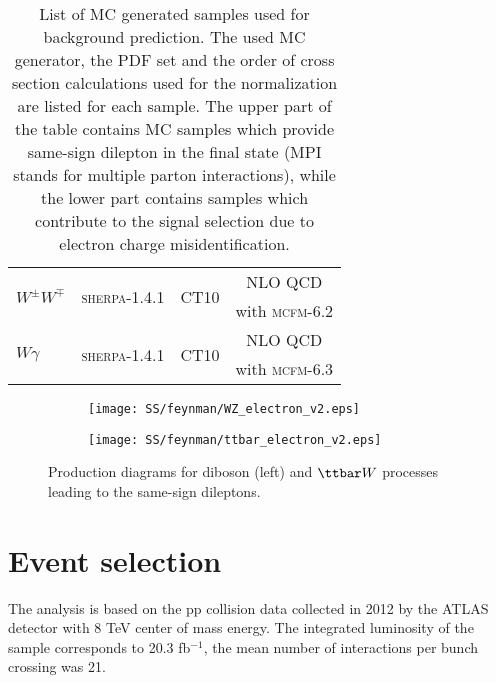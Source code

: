 \begin{table}[ht]
\begin{center}
\begin{tabular}{l|c|c|c}
\multirow{2}{*}{$W^{\pm}W^{\mp}$} & \multirow{2}{*}{{\scshape sherpa-1.4.1}} & \multirow{2}{*}{CT10}& NLO QCD \\
& &  & with {\scshape mcfm-6.2}\\
\hline
\multirow{2}{*}{$W\gamma$} & \multirow{2}{*}{{\scshape sherpa}-1.4.1} & \multirow{2}{*}{CT10}& NLO QCD\\
& &  & with {\scshape mcfm-6.3}\\
\hline
\end{tabular}
\end{center}
  \caption{List of MC generated samples used for background prediction. 
  The used MC generator, the PDF set and the order of cross section calculations used for the normalization are listed for each sample.
  The upper part of the table contains MC samples which provide same-sign dilepton in the final state
  (MPI stands for multiple parton interactions), 
  while the lower part contains samples which contribute to the signal selection due to electron charge misidentification.}
\label{tab:MC_cross}
\end{table}

\begin{figure}

\begin{subfigure}{.5\textwidth}
  \centering
  \texttt{[image: SS/feynman/WZ\_electron\_v2.eps]}
\end{subfigure}%
\begin{subfigure}{.5\textwidth}
  \centering
  \texttt{[image: SS/feynman/ttbar\_electron\_v2.eps]}
\end{subfigure}

\caption{Production diagrams for diboson (left) and $\ttbar W$ processes leading to the same-sign dileptons.}
  \label{fig:prompt_bkg_feynman_diag}
\end{figure}


\section{Event selection}

The analysis is based on the pp collision data collected in 2012 by the ATLAS detector with 8 TeV center of mass energy.
The integrated luminosity of the sample corresponds to 20.3 fb$^{-1}$, the mean number of interactions per bunch crossing was 21.

